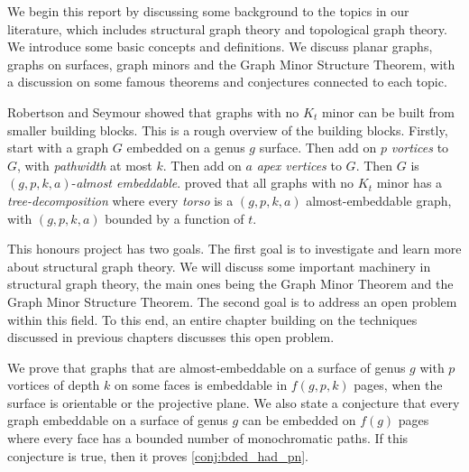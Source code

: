 We begin this report by discussing some background to the topics in our literature, which includes structural graph theory and topological graph theory. We introduce some basic concepts and definitions. We discuss planar graphs, graphs on surfaces, graph minors and the Graph Minor Structure Theorem, with a discussion on some famous theorems and conjectures connected to each topic. 

Robertson and Seymour showed that graphs with no \(K_t\) minor can be built from smaller building blocks. This is a rough overview of the building blocks. Firstly, start with a graph \(G\) embedded on a genus \(g\) surface. Then add on \(p\) \textit{vortices} to \(G\), with \textit{pathwidth} at most \(k\). Then add on \(a\) \textit{apex vertices} to \(G\). Then \(G\) is \((g, p, k, a)\)-\textit{almost embeddable}. \textcite{robertsonGraphMinorsXVI2003} proved that all graphs with no \(K_t\) minor has a \textit{tree-decomposition} where every \textit{torso} is a \((g, p, k, a)\) almost-embeddable graph, with \((g, p, k, a)\) bounded by a function of \(t\).

This honours project has two goals. The first goal is to investigate and learn more about structural graph theory. We will discuss some important machinery in structural graph theory, the main ones being the Graph Minor Theorem and the Graph Minor Structure Theorem. The second goal is to address an open problem within this field. To this end, an entire chapter building on the techniques discussed in previous chapters discusses this open problem. 

We prove that graphs that are almost-embeddable on a surface of genus $g$ with $p$ vortices of depth $k$ on some faces is embeddable in $f(g, p, k)$ pages, when the surface is orientable or the projective plane. We also state a conjecture that every graph embeddable on a surface of genus $g$ can be embedded on $f(g)$ pages where every face has a bounded number of monochromatic paths. If this conjecture is true, then it proves \cref{conj:bded_had_pn}. 